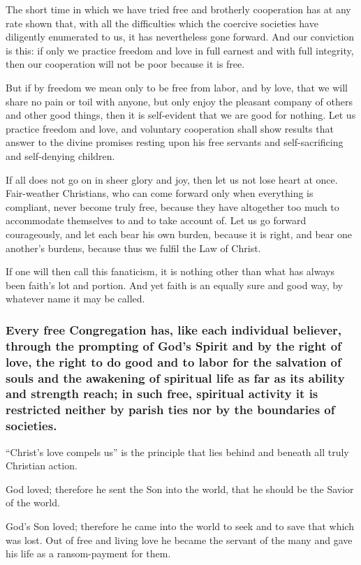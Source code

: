 The short time in which we have tried free and brotherly cooperation has at any rate shown that, with all the difficulties which the coercive societies have diligently enumerated to us, it has nevertheless gone forward. And our conviction is this: if only we practice freedom and love in full earnest and with full integrity, then our cooperation will not be poor because it is free.

But if by freedom we mean only to be free from labor, and by love, that we will share no pain or toil with anyone, but only enjoy the pleasant company of others and other good things, then it is self-evident that we are good for nothing. Let us practice freedom and love, and voluntary cooperation shall show results that answer to the divine promises resting upon his free servants and self-sacrificing and self-denying children.

If all does not go on in sheer glory and joy, then let us not lose heart at once. Fair-weather Christians, who can come forward only when everything is compliant, never become truly free, because they have altogether too much to accommodate themselves to and to take account of. Let us go forward courageously, and let each bear his own burden, because it is right, and bear one another’s burdens, because thus we fulfil the Law of Christ.

If one will then call this fanaticism, it is nothing other than what has always been faith’s lot and portion. And yet faith is an equally sure and good way, by whatever name it may be called.

\subsubsection{Every free Congregation has, like each individual believer, through the prompting of God’s Spirit and by the right of love, the right to do good and to labor for the salvation of souls and the awakening of spiritual life as far as its ability and strength reach; in such free, spiritual activity it is restricted neither by parish ties nor by the boundaries of societies.}

“Christ’s love compels us” is the principle that lies behind and beneath all truly Christian action.

God loved; therefore he sent the Son into the world, that he should be the Savior of the world.

God’s Son loved; therefore he came into the world to seek and to save that which was lost. Out of free and living love he became the servant of the many and gave his life as a ransom-payment for them.

